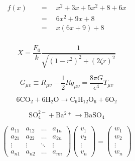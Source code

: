 \documentclass[10pt, a4paper]{article}
\begin{document}
    \begin{align}
        \begin{split}
            f(x) \quad &=  \quad x^2 + 3x + 5x^2 + 8 + 6x \\ 
             \quad &=  \quad 6x^2 + 9x + 8 \\
             \quad &=  \quad x(6x+9) + 8 \\
        \end{split}
    \end{align}
    
    \begin{equation}
        X = \frac{F_0}{k} \frac{1}{\sqrt{(1-r^2)^2 + (2\zeta r)^2}}
    \end{equation}
    
    \begin{equation}
        G_{\mu\upsilon} \equiv R_{\mu\upsilon} - \frac{1}{2} Rg_{\mu\upsilon} = \frac{8\pi G}{e^4} T_{\mu\upsilon}
    \end{equation}
    
    \begin{equation}
        \mathrm{6CO_2 + 6H_2 O \rightarrow{} C_6 H_{12} O_6 + 6O_2}
    \end{equation}
    
    \begin{equation}
        \mathrm{SO_4^{2-} + Ba^{2+} \rightarrow{} BaSO_4}
    \end{equation}
    
    \begin{equation}
        \begin{pmatrix}
            a_{11} & a_{12} & \dots  & a_{1n} \\
            a_{21} & a_{22} & \dots  & a_{2n} \\
            \vdots & \vdots & \ddots & \vdots \\
            a_{n1} & a_{n2} & \dots  & a_{nn}
        \end{pmatrix}
        \begin{pmatrix}
            v_{1} \\
            v_{2} \\
            \vdots \\
            v_{n}
        \end{pmatrix}
        =
        \begin{pmatrix}
            w_{1} \\
            w_{2} \\
            \vdots \\
            w_{n}
        \end{pmatrix}
    \end{equation}    
    
\end{document}
